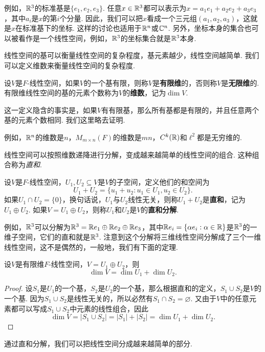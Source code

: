 例如，$\mathbb{R}^3$的标准基是$\{e_1,e_2,e_3\}$. 任意$x\in\mathbb{R}^3$都可以表示为$x=a_1e_1+a_2e_2+a_3e_3$，其中$a_i$是$x$的第$i$个分量. 因此，我们可以把$x$看成一个三元组$(a_1,a_2,a_3)$，这就是$x$在标准基下的坐标. 这样的讨论也适用于$\mathbb{R}^n$或$\mathbb{C}^n$. 另外，坐标本身的集合也可以被看作是一个线性空间，例如，$\mathbb{R}^3$的坐标集合就是$\mathbb{R}^3$本身. 

线性空间的基可以衡量线性空间的复杂程度，基元素越少，线性空间越简单. 我们可以定义维数来衡量线性空间的复杂程度. 

\begin{definition}[维数]
设$V$是$F$-线性空间，如果$V$的一个基有限，则称$V$是\textbf{有限维}的，否则称$V$是\textbf{无限维}的. 有限维线性空间的基的元素个数称为$V$的\textbf{维数}，记为$\dim V$. 
\end{definition}

这一定义隐含的事实是，如果$V$有有限基，那么所有基都是有限的，并且任意两个基的元素个数相同. 我们这里略去证明. 

例如，$\mathbb{R}^n$的维数是$n$，$M_{m\times n}(F)$的维数是$mn$，$C^k(\mathbb{R})$和$\ell^2$都是无穷维的. 

线性空间可以按照维数递降进行分解，变成越来越简单的线性空间的组合. 这种组合称为\textit{直和}. 

\begin{definition}[和空间与直和]
设$V$是$F$-线性空间，$U_1,U_2\subseteq V$是$V$的子空间，定义他们的和空间为
\[
    U_1+U_2=\{u_1+u_2:u_1\in U_1,u_2\in U_2\}.
\]
如果$U_1\cap U_2=\{0\}$，换句话说，$U_1$与$U_2$线性无关，则称$U_1+U_2$是\textbf{直和}，记为$U_1\oplus U_2$. 如果$V=U_1\oplus U_2$，则称$U_1$和$U_2$是$V$的\textbf{直和分解}. 
\end{definition}

例如，$\mathbb{R}^3$可以分解为$\mathbb{R}^3=\mathbb{R} e_1\oplus \mathbb{R} e_2\oplus \mathbb{R} e_3$，其中$\mathbb{R} e_i=\{\alpha e_i:\alpha\in\mathbb{R}\}$是$\mathbb{R}^3$的一维子空间，它们的直和就是$\mathbb{R}^3$. 注意到这个分解将三维线性空间分解成了三个一维线性空间，这不是偶然的，一般地，我们有下面的定理. 

\begin{theorem}[维数定理]\label{theorem:dim-thm}
设$V$是有限维$F$-线性空间，$V=U_1\oplus U_2$，则
\[
    \dim V=\dim U_1+\dim U_2.
\]
\end{theorem}
\begin{proof}
    设$S_1$是$U_1$的一个基，$S_2$是$U_2$的一个基，那么根据直和的定义，$S_1\cup S_2$是$V$的一个基. 因为$S_1\cup S_2$是线性无关的，所以必然有$S_1\cap S_2=\varnothing$. 又由于$V$中的任意元素都可以写成$S_1\cup S_2$中元素的线性组合，因此
    \[
        \dim V=|S_1\cup S_2|=|S_1|+|S_2|=\dim U_1+\dim U_2.
    \]
\end{proof}
通过直和分解，我们可以把线性空间分成越来越简单的部分. 


